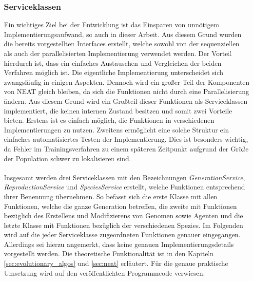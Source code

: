 \subsubsection{Serviceklassen}
Ein wichtiges Ziel bei der Entwicklung ist das Einsparen von unnötigem Implementierungsaufwand, so auch in dieser Arbeit. Aus diesem Grund wurden die bereits vorgestellten Interfaces erstellt, welche sowohl von der sequenziellen als auch der parallelisierten Implementierung verwendet werden. Der Vorteil hierdurch ist, dass ein einfaches Austauschen und Vergleichen der beiden Verfahren möglich ist. Die eigentliche Implementierung unterscheidet sich zwangsläufig in einigen Aspekten. Dennoch wird ein großer Teil der Komponenten von \ac{NEAT} gleich bleiben, da sich die Funktionen nicht durch eine Parallelisierung ändern. Aus diesem Grund wird ein Großteil dieser Funktionen als Serviceklassen implementiert, die keinen internen Zustand besitzen und somit zwei Vorteile bieten. Erstens ist es einfach möglich, die Funktionen in verschiedenen Implementierungen zu nutzen. Zweitens ermöglicht eine solche Struktur ein einfaches automatisiertes Testen der Implementierung. Dies ist besonders wichtig, da Fehler im Trainingsverfahren zu einem späteren Zeitpunkt aufgrund der Größe der Population schwer zu lokalisieren sind.
\\\\
Insgesamt werden drei Serviceklassen mit den Bezeichnungen \emph{GenerationService}, \emph{ReproductionService} und \emph{SpeciesService} erstellt, welche Funktionen entsprechend ihrer Benennung übernehmen. So befasst sich die erste Klasse mit allen Funktionen, welche die ganze Generation betreffen, die zweite mit Funktionen bezüglich des Erstellens und Modifizierens von Genomen sowie Agenten und die letzte Klasse mit Funktionen bezüglich der verschiedenen Spezies. Im Folgenden wird auf die jeder Serviceklasse zugeordneten Funktionen genauer eingegangen. Allerdings sei hierzu angemerkt, dass keine genauen Implementierungsdetails vorgestellt werden. Die theoretische Funktionalität ist in den Kapiteln \ref{sec:evolutionary_algos} und  \ref{sec:neat} erläutert. Für die genaue praktische Umsetzung wird auf den veröffentlichten Programmcode verwiesen.
\\\\
